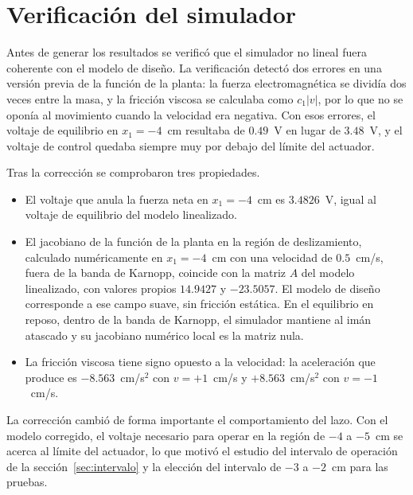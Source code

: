 \chapter{Verificación del simulador}\label{ap:verificacion}

Antes de generar los resultados se verificó que el simulador no lineal fuera coherente con el modelo de diseño. La verificación detectó dos errores en una versión previa de la función de la planta: la fuerza electromagnética se dividía dos veces entre la masa, y la fricción viscosa se calculaba como $c_1|v|$, por lo que no se oponía al movimiento cuando la velocidad era negativa. Con esos errores, el voltaje de equilibrio en $x_1=-4$~cm resultaba de $0.49$~V en lugar de $3.48$~V, y el voltaje de control quedaba siempre muy por debajo del límite del actuador.

Tras la corrección se comprobaron tres propiedades.

\begin{itemize}
  \item El voltaje que anula la fuerza neta en $x_1=-4$~cm es $3.4826$~V, igual al voltaje de equilibrio del modelo linealizado.
  \item El jacobiano de la función de la planta en la región de deslizamiento, calculado numéricamente en $x_1=-4$~cm con una velocidad de $0.5$~cm/s, fuera de la banda de Karnopp, coincide con la matriz $A$ del modelo linealizado, con valores propios $14.9427$ y $-23.5057$. El modelo de diseño corresponde a ese campo suave, sin fricción estática. En el equilibrio en reposo, dentro de la banda de Karnopp, el simulador mantiene al imán atascado y su jacobiano numérico local es la matriz nula.
  \item La fricción viscosa tiene signo opuesto a la velocidad: la aceleración que produce es $-8.563$~cm/s$^2$ con $v=+1$~cm/s y $+8.563$~cm/s$^2$ con $v=-1$~cm/s.
\end{itemize}

La corrección cambió de forma importante el comportamiento del lazo. Con el modelo corregido, el voltaje necesario para operar en la región de $-4$ a $-5$~cm se acerca al límite del actuador, lo que motivó el estudio del intervalo de operación de la sección~\ref{sec:intervalo} y la elección del intervalo de $-3$ a $-2$~cm para las pruebas.
